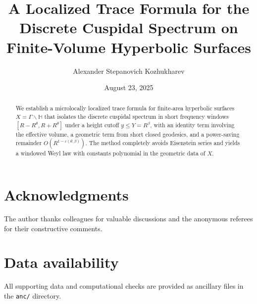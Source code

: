 \documentclass[12pt]{amsart}
\title[A Localized Trace Formula]{A Localized Trace Formula for the Discrete Cuspidal Spectrum on Finite-Volume Hyperbolic Surfaces}
\author{Alexander Stepanovich Kozhukharev}
\date{August 23, 2025}
\numberwithin{equation}{section}
\theoremstyle{plain}
\theoremstyle{definition}
\theoremstyle{remark}
\newcommand{\HH}{\mathbb{H}}
\begin{document}
\begin{abstract}
We establish a microlocally localized trace formula for finite-area hyperbolic surfaces $X=\Gamma\backslash\HH$ that isolates the discrete cuspidal spectrum in short frequency windows $[R-R^\theta,R+R^\theta]$ under a height cutoff $y\le Y=R^\beta$, with an identity term involving the effective volume, a geometric term from short closed geodesics, and a power-saving remainder $O(R^{1-\varepsilon(\theta,\beta)})$. The method completely avoids Eisenstein series and yields a windowed Weyl law with constants polynomial in the geometric data of $X$.
\end{abstract}

\maketitle

\tableofcontents









\section*{Acknowledgments}
The author thanks colleagues for valuable discussions and the anonymous referees for their constructive comments.

\section*{Data availability}
All supporting data and computational checks are provided as ancillary files in the \texttt{anc/} directory.

\clearpage
\appendix



\end{document}
